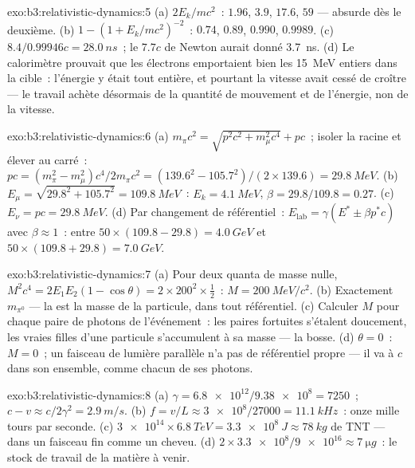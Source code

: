 \begin{solution}{exo:b3:relativistic-dynamics:5}
(a) $2E_k/mc^2$~: $1.96$, $3.9$, $17.6$, $59$ --- absurde dès le
deuxième. (b) $1 - (1 + E_k/mc^2)^{-2}$~: $0.74$, $0.89$, $0.990$,
$0.9989$. (c) $8.4/0.99946c = \qty{28.0}{ns}$~; le $7.7c$ de Newton
aurait donné \qty{3.7}{ns}. (d) Le calorimètre prouvait que les
électrons emportaient bien les \qty{15}{MeV} entiers dans la cible~:
l'énergie y était tout entière, et pourtant la vitesse avait cessé de
croître --- le travail achète désormais de la quantité de mouvement et
de l'énergie, non de la vitesse.
\end{solution}

\begin{solution}{exo:b3:relativistic-dynamics:6}
(a) $m_\pi c^2 = \sqrt{p^2c^2 + m_\mu^2c^4} + pc$~; isoler la racine
et élever au carré~: $pc = (m_\pi^2 - m_\mu^2)c^4/2m_\pi c^2 =
(139.6^2 - 105.7^2)/(2 \times 139.6) = \qty{29.8}{MeV}$. (b) $E_\mu =
\sqrt{29.8^2 + 105.7^2} = \qty{109.8}{MeV}$~: $E_k = \qty{4.1}{MeV}$,
$\beta = 29.8/109.8 = 0.27$. (c) $E_\nu = pc = \qty{29.8}{MeV}$. (d)
Par changement de référentiel~: $E_{\text{lab}} = \gamma(E^* \pm \beta p^*c)$ avec $\beta
\approx 1$~: entre $50 \times (109.8 - 29.8) = \qty{4.0}{GeV}$ et
$50 \times (109.8 + 29.8) = \qty{7.0}{GeV}$.
\end{solution}

\begin{solution}{exo:b3:relativistic-dynamics:7}
(a) Pour deux quanta de masse nulle, $M^2c^4 = 2E_1E_2(1 - \cos\theta) =
2 \times 200^2 \times \tfrac12$~: $M = \qty{200}{MeV}/c^2$. (b)
Exactement $m_{\pi^0}$ --- la  est la masse de la
particule, dans tout référentiel. (c) Calculer $M$ pour chaque paire de
photons de l'événement~: les paires fortuites s'étalent doucement, les
vraies filles d'une particule s'accumulent à sa masse --- la bosse. (d)
$\theta = 0$~: $M = 0$~; un faisceau de lumière parallèle n'a pas de
référentiel propre --- il va à $c$ dans son ensemble, comme chacun de
ses photons.
\end{solution}

\begin{solution}{exo:b3:relativistic-dynamics:8}
(a) $\gamma = \num{6.8e12}/\num{9.38e8} = 7250$~; $c - v \approx
c/2\gamma^2 = \qty{2.9}{m/s}$. (b) $f = v/L \approx \num{3e8}/27000 =
\qty{11.1}{kHz}$~: onze mille tours par seconde. (c) $\num{3e14}
\times \qty{6.8}{TeV} = \qty{3.3e8}{J} \approx \qty{78}{kg}$ de TNT
--- dans un faisceau fin comme un cheveu. (d) $2 \times \num{3.3e8}/\num{9e16} \approx
\qty{7}{\micro g}$~: le stock de travail de la matière à venir.
\end{solution}

